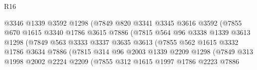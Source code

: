 \begin{lexlean}{R16}
\begin{coremodule}
                                @3346
                                @1339
                                @3592
                                @1298
                                (@7849
                                  @820
                                  @3341
                                  @3345
                                  @3616
                                  @3592
                                  (@7855
                                    @670
                                    @1615
                                    @3340
                                    @1786
                                    @3615
                                    @7886
                                    (@7815
                                      @564
                                      @96
                                      @3338
                                      @1339
                                      @3613
                                      @1298
                                      (@7849
                                        @563
                                        @3333
                                        @3337
                                        @3635
                                        @3613
                                        (@7855
                                          @562
                                          @1615
                                          @3332
                                          @1786
                                          @3634
                                          @7886
                                          (@7815
                                            @314
                                            @96
                                            @2003
                                            @1339
                                            @2209
                                            @1298
                                            (@7849
                                              @313
                                              @1998
                                              @2002
                                              @2224
                                              @2209
                                              (@7855
                                                @312
                                                @1615
                                                @1997
                                                @1786
                                                @2223
                                                @7886

\end{coremodule}
\end{lexlean}

